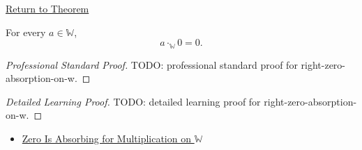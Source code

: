 \newpage
{}
\label{prf:right-zero-absorption-on-w}

\begin{remark*}[Return]
\hyperref[thm:right-zero-absorption-on-w]{Return to Theorem}
\end{remark*}

\begin{theorem*}
For every $a\in\mathbb{W}$,
\[
a\cdot_{\mathbb{W}}0=0.
\]
\end{theorem*}

\begin{proof}[Professional Standard Proof]
\LRAProofBodyStart
TODO: professional standard proof for right-zero-absorption-on-w.
\end{proof}

\begin{proof}[Detailed Learning Proof]
\LRAProofBodyStart
TODO: detailed learning proof for right-zero-absorption-on-w.
\end{proof}

\begin{remark*}
\end{remark*}

\begin{dependencies}
\begin{itemize}
  \item \hyperref[thm:zero-absorbing-for-multiplication-on-w]{Zero Is Absorbing for Multiplication on $\mathbb{W}$}
\end{itemize}
\end{dependencies}

\clearpage
